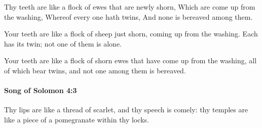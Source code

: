 			\begin{versebox}
					\item[BHS] 
					\item[LXX] 
					\item[ASV] Thy teeth are like a flock of ewes that are newly shorn, Which are come up from the washing, Whereof every one hath twins, And none is bereaved among them.
					\item[NIV] Your teeth are like a flock of sheep just shorn, coming up from the washing. Each has its twin; not one of them is alone.
					\item[NRSV] Your teeth are like a flock of shorn ewes that have come up from the washing, all of which bear twins, and not one among them is bereaved.
			\end{versebox}

		\paragraph{Song of Solomon 4:3} %
			\label{SONGOFSOLOMON-4-3}

			Thy lips are like a thread of scarlet, and thy speech is comely: thy temples are like a piece of a pomegranate within thy locks.


